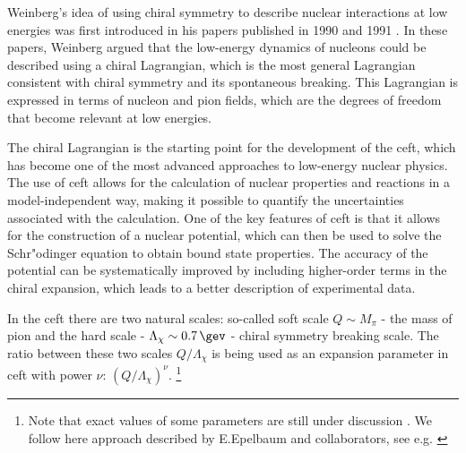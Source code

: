 Weinberg's idea of using chiral symmetry to describe nuclear interactions at low
energies was first introduced in his papers published in 1990 and 1991 \cite{WEINBERG1990,WEINBERG1991}.
In these papers, Weinberg argued that the low-energy dynamics of nucleons
could be described using a chiral Lagrangian, which is the most general
Lagrangian consistent with chiral symmetry and its spontaneous breaking.
This Lagrangian is expressed in terms of nucleon and pion fields,
which are the degrees of freedom that become relevant at low energies.

The chiral Lagrangian is the starting point for the development of
the \gls{ceft}, which has become one of the
most advanced approaches to low-energy nuclear physics.
The use of \gls{ceft} allows for the calculation of nuclear properties
and reactions in a model-independent way, making it possible to
quantify the uncertainties associated with the calculation. One of the
key features of \gls{ceft} is that it allows for the construction of
a nuclear potential, which can then be used to solve the Schr"odinger
equation to obtain bound state properties. The accuracy of the
potential can be systematically improved by including higher-order
terms in the chiral expansion, which leads to a better description of
experimental data.

 
In the \gls{ceft} there are two natural scales: so-called soft scale $Q \sim M_\pi$  -
the mass of pion and the hard scale -
$\Lambda_\chi \sim \SI{0.7}{\gev}$ - chiral symmetry breaking scale.
The ratio between these two scales $Q/\Lambda_\chi$
is being used as an expansion parameter in  \gls{ceft} with power
$\nu$: $\left(Q/\Lambda_\chi\right)^\nu$.
\footnote{Note that exact values of some parameters are still under discussion \cite{Epelbaum2004}. We follow here approach described by E.Epelbaum and collaborators, see e.g. \cite{reinkrebs2018}}

